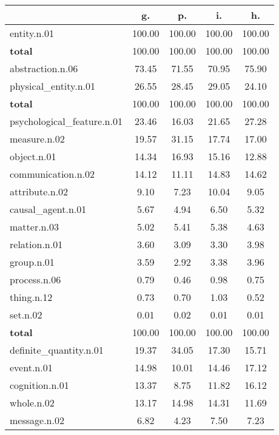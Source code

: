 \begin{table}[h!]
\begin{center}
\begin{tabular}{| l || c | c | c | c |}\hline
 & {\bf g.} & {\bf p.} & {\bf i.} & {\bf h.} \\\hline\hline
entity.n.01 & 100.00  & 100.00  & 100.00  & 100.00 \\\hline\hline
{{\bf total}} & 100.00  & 100.00  & 100.00  & 100.00 \\\hline\hline\hline
abstraction.n.06 & 73.45  & 71.55  & 70.95  & 75.90 \\\hline
physical\_entity.n.01 & 26.55  & 28.45  & 29.05  & 24.10 \\\hline\hline
{{\bf total}} & 100.00  & 100.00  & 100.00  & 100.00 \\\hline\hline\hline
psychological\_feature.n.01 & 23.46  & 16.03  & 21.65  & 27.28 \\\hline
measure.n.02 & 19.57  & 31.15  & 17.74  & 17.00 \\\hline
object.n.01 & 14.34  & 16.93  & 15.16  & 12.88 \\\hline
communication.n.02 & 14.12  & 11.11  & 14.83  & 14.62 \\\hline
attribute.n.02 & 9.10  & 7.23  & 10.04  & 9.05 \\\hline
causal\_agent.n.01 & 5.67  & 4.94  & 6.50  & 5.32 \\\hline
matter.n.03 & 5.02  & 5.41  & 5.38  & 4.63 \\\hline
relation.n.01 & 3.60  & 3.09  & 3.30  & 3.98 \\\hline
group.n.01 & 3.59  & 2.92  & 3.38  & 3.96 \\\hline
process.n.06 & 0.79  & 0.46  & 0.98  & 0.75 \\\hline
thing.n.12 & 0.73  & 0.70  & 1.03  & 0.52 \\\hline
set.n.02 & 0.01  & 0.02  & 0.01  & 0.01 \\\hline\hline
{{\bf total}} & 100.00  & 100.00  & 100.00  & 100.00 \\\hline\hline\hline
definite\_quantity.n.01 & 19.37  & 34.05  & 17.30  & 15.71 \\\hline
event.n.01 & 14.98  & 10.01  & 14.46  & 17.12 \\\hline
cognition.n.01 & 13.37  & 8.75  & 11.82  & 16.12 \\\hline
whole.n.02 & 13.17  & 14.98  & 14.31  & 11.69 \\\hline
message.n.02 & 6.82  & 4.23  & 7.50  & 7.23 \\\hline

\end{tabular}
\end{center}
\end{table}
